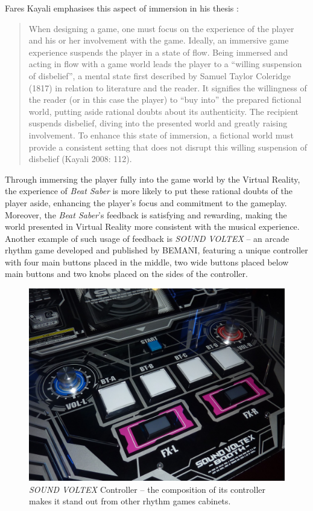 Fares Kayali emphasises this aspect of immersion in his thesis \cite{faresplayingmusic}:

\begin{quote}
    When designing a game, one must focus on the experience of the player and his or her involvement with the game. Ideally, an immersive game experience suspends the player in a state of flow. Being immersed and acting in flow with a game world leads the player to a “willing suspension of disbelief”, a mental state first described by Samuel Taylor Coleridge (1817) in relation to literature and the reader. It signifies the willingness of the reader (or in this case the player) to “buy into” the prepared fictional world, putting aside rational doubts about its authenticity. The recipient suspends disbelief, diving into the presented world and greatly raising involvement. To enhance this state of immersion, a fictional world must provide a consistent setting that does not disrupt this willing suspension of disbelief (Kayali 2008: 112).
\end{quote}

Through immersing the player fully into the game world by the Virtual Reality, the experience of \textit{Beat Saber} is more likely to put these rational doubts of the player aside, enhancing the player’s focus and commitment to the gameplay. Moreover, the \textit{Beat Saber}’s feedback is satisfying and rewarding, making the world presented in Virtual Reality more consistent with the musical experience.
Another example of such usage of feedback is \textit{SOUND VOLTEX} -- an arcade rhythm game developed and published by BEMANI, featuring a unique controller with four main buttons placed in the middle, two wide buttons placed below main buttons and two knobs placed on the sides of the controller.

\begin{figure}[h]
    \centering\includegraphics[scale=0.5]{obrazki/sdvxcontroller.jpeg}
    \caption{\textit{SOUND VOLTEX} Controller -- the composition of its controller makes it stand out from other rhythm games cabinets.\cite{sdvxcontroller}}
    \label{fig:sdvx}
\end{figure}

